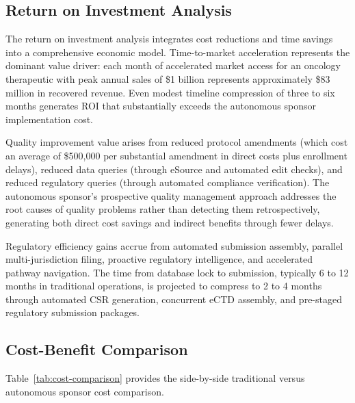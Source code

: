 \subsection{Return on Investment Analysis}

The return on investment analysis integrates cost reductions and time savings into a
comprehensive economic model. Time-to-market acceleration represents the dominant value
driver: each month of accelerated market access for an oncology therapeutic with peak
annual sales of \$1 billion represents approximately \$83 million in recovered revenue.
Even modest timeline compression of three to six months generates ROI that substantially
exceeds the autonomous sponsor implementation cost.

Quality improvement value arises from reduced protocol amendments (which cost an average
of \$500,000 per substantial amendment in direct costs plus enrollment delays), reduced
data queries (through eSource and automated edit checks), and reduced regulatory queries
(through automated compliance verification). The autonomous sponsor's prospective quality
management approach addresses the root causes of quality problems rather than detecting
them retrospectively, generating both direct cost savings and indirect benefits through
fewer delays.

Regulatory efficiency gains accrue from automated submission assembly, parallel
multi-jurisdiction filing, proactive regulatory intelligence, and accelerated pathway
navigation. The time from database lock to submission, typically 6 to 12 months in
traditional operations, is projected to compress to 2 to 4 months through automated CSR
generation, concurrent eCTD assembly, and pre-staged regulatory submission packages.

\subsection{Cost-Benefit Comparison}

Table~\ref{tab:cost-comparison} provides the side-by-side traditional versus autonomous
sponsor cost comparison.

